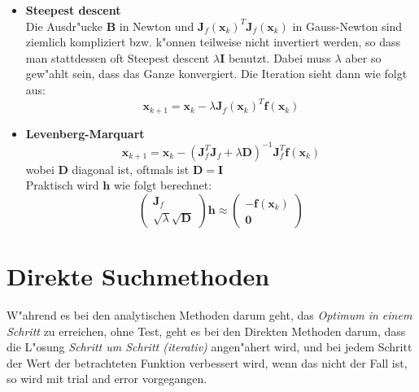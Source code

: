 \documentclass[german, 10pt, a4paper, twocolumn]{scrartcl}
\begin{document}
\begin{itemize}
	\item \textbf{Steepest descent}\\
		Die Ausdr"ucke $\mathbf{B}$ in Newton und $\mathbf{J}_f(\mathbf{x}_k)^T\mathbf{J}_f(\mathbf{x}_k)$ in Gauss-Newton sind ziemlich kompliziert bzw. k"onnen teilweise nicht invertiert werden, so dass man stattdessen oft Steepest descent $\lambda \mathbf{I}$ benutzt. Dabei muss $\lambda$ aber so gew"ahlt sein, dass das Ganze konvergiert. Die Iteration sieht dann wie folgt aus:
		\begin{displaymath}
			\mathbf{x}_{k+1} = \mathbf{x}_k - \lambda \mathbf{J}_f(\mathbf{x}_k)^T \mathbf{f}(\mathbf{x}_k)
		\end{displaymath}
	
	\item \textbf{Levenberg-Marquart}
		\begin{displaymath}
			\mathbf{x}_{k+1} = \mathbf{x}_k - (\mathbf{J}_f^T\mathbf{J}_f+\lambda \mathbf{D})^{-1} \mathbf{J}_f^T\mathbf{f}(\mathbf{x}_k) 
		\end{displaymath}
		wobei $\mathbf{D}$ diagonal ist, oftmals ist $\mathbf{D}=\mathbf{I}$\\
		Praktisch wird $\mathbf{h}$ wie folgt berechnet:
		\begin{displaymath}
			\left (
				\begin{array}{c}
					\mathbf{J}_f \\
					\sqrt{\lambda} \sqrt{\mathbf{D}}
				\end{array}
			\right )
			\mathbf{h} \approx \left (
				\begin{array}{c}
					-\mathbf{f}(\mathbf{x}_k) \\
					\mathbf{0}
				\end{array}
			\right )
		\end{displaymath}
\end{itemize}

\section{Direkte Suchmethoden}

W"ahrend es bei den analytischen Methoden darum geht, das \textit{Optimum in einem Schritt} zu erreichen, ohne Test, geht es bei den Direkten Methoden darum, dass die L"osung \textit{Schritt um Schritt (iterativ)} angen"ahert wird, und bei jedem Schritt der Wert der betrachteten Funktion verbessert wird, wenn das nicht der Fall ist, so wird mit trial and error vorgegangen.
\end{document}
